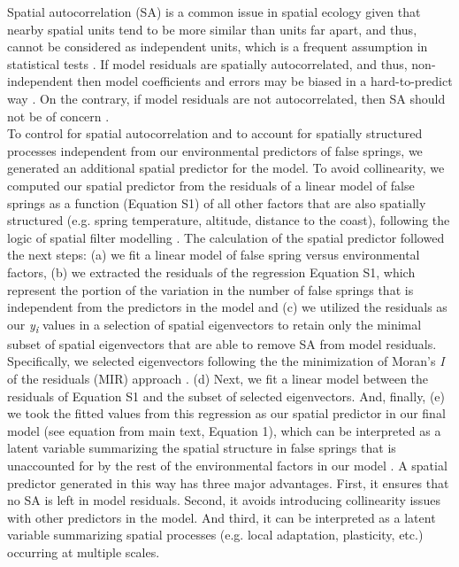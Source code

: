 \documentclass{article}\usepackage[]{graphicx}\usepackage[]{color}
\begin{document}
{Spatial autocorrelation (SA) is a common issue in spatial ecology given that nearby spatial units tend to be more similar than units far apart, and thus, cannot be considered as independent units, which is a frequent assumption in statistical tests \citep{diniz2003spatial}. If model residuals are spatially autocorrelated, and thus, non-independent then model coefficients and errors may be biased in a hard-to-predict way \citep{mauricio2009coefficient}. On the contrary, if model residuals are not autocorrelated, then SA should not be of concern \citep{hawkins2012eight}.\\

To control for spatial autocorrelation and to account for spatially structured processes independent from our environmental predictors of false springs, we generated an additional spatial predictor for the model. To avoid collinearity, we computed our spatial predictor from the residuals of a linear model of false springs as a function (Equation S1) of all other factors that are also spatially structured (e.g. spring temperature, altitude, distance to the coast), following the logic of spatial filter modelling \citep{diniz2005modelling}. The calculation of the spatial predictor followed the next steps: (a) we fit a linear model of false spring versus environmental factors, (b) we extracted the residuals of the regression Equation S1, which represent the portion of the variation in the number of false springs that is independent from the predictors in the model and (c) we utilized the residuals as our \textit{y\textsubscript{i}} values in a selection of spatial eigenvectors to retain only the minimal subset of spatial eigenvectors that are able to remove SA from model residuals. Specifically, we selected eigenvectors following the the minimization of Moran's \textit{I} of the residuals (MIR) approach \citep{griffith2006spatial,diniz2012selection,Baumen2017}. (d) Next, we fit a linear model between the residuals of Equation S1 and the subset of selected eigenvectors. And, finally, (e) we took the fitted values from this regression as our spatial predictor in our final model (see equation from main text, Equation 1), which can be interpreted as a latent variable summarizing the spatial structure in false springs that is unaccounted for by the rest of the environmental factors in our model \citep{morales2012imprint}. A spatial predictor generated in this way has three major advantages. First, it ensures that no SA is left in model residuals. Second, it avoids introducing collinearity issues with other predictors in the model. And third, it can be interpreted as a latent variable summarizing spatial processes (e.g. local adaptation, plasticity, etc.) occurring at multiple scales.

}
\end{document}
